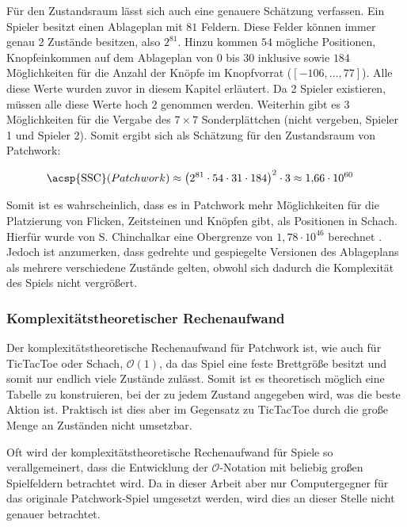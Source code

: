 Für den Zustandsraum lässt sich auch eine genauere Schätzung verfassen. Ein Spieler besitzt einen Ablageplan mit $81$ Feldern. Diese Felder können immer genau 2 Zustände besitzen, also $2^{81}$. Hinzu kommen $54$ mögliche Positionen, Knopfeinkommen auf dem Ablageplan von $0$ bis $30$ inklusive sowie $184$ Möglichkeiten für die Anzahl der Knöpfe im Knopfvorrat ($\left[-106,\dots,77\right]$). Alle diese Werte wurden zuvor in diesem Kapitel erläutert. Da 2 Spieler existieren, müssen alle diese Werte hoch $2$ genommen werden. Weiterhin gibt es 3 Möglichkeiten für die Vergabe des $7\times 7$ Sonderplättchen (nicht vergeben, Spieler 1 und Spieler 2). Somit ergibt sich als Schätzung für den Zustandsraum von Patchwork:

\begin{align}
    \label{eqn:ssc-patchwork}
    \text{\acsp{SSC}}(Patchwork) & \approx \left(2^{81} \cdot 54 \cdot 31 \cdot 184\right)^{2}\cdot 3 \approx 1{,}66 \cdot 10^{60}
\end{align}

Somit ist es wahrscheinlich, dass es in Patchwork mehr Möglichkeiten für die Platzierung von Flicken, Zeitsteinen und Knöpfen gibt, als Positionen in Schach. Hierfür wurde von S. Chinchalkar eine Obergrenze von $1{,}78\cdot 10^{46}$ berechnet \cite[S. 182]{1996.ChessPositions}. Jedoch ist anzumerken, dass gedrehte und gespiegelte Versionen des Ablageplans als mehrere verschiedene Zustände gelten, obwohl sich dadurch die Komplexität des Spiels nicht vergrößert.

\subsubsection*{Komplexitätstheoretischer Rechenaufwand}

Der komplexitätstheoretische Rechenaufwand für Patchwork ist, wie auch für TicTacToe oder Schach, $\mathcal{O}(1)$, da das Spiel eine feste Brettgröße besitzt und somit nur endlich viele Zustände zulässt. Somit ist es theoretisch möglich eine Tabelle zu konstruieren, bei der zu jedem Zustand angegeben wird, was die beste Aktion ist. Praktisch ist dies aber im Gegensatz zu TicTacToe durch die große Menge an Zuständen nicht umsetzbar.

Oft wird der komplexitätstheoretische Rechenaufwand für Spiele so verallgemeinert, dass die Entwicklung der $\mathcal{O}$-Notation mit beliebig großen Spielfeldern betrachtet wird. Da in dieser Arbeit aber nur Computergegner für das originale Patchwork-Spiel umgesetzt werden, wird dies an dieser Stelle nicht genauer betrachtet.

